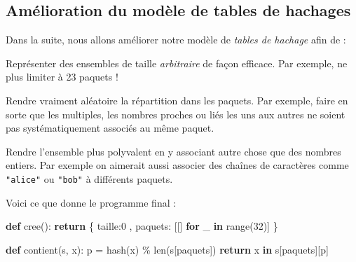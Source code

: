 \documentclass[a4paper,17pt]{extarticle}
\newenvironment{formule}%
{\begin{form}\color{bleuamu}}
{\end{form}}
\newenvironment{Shaded}{}{}
\newcommand{\KeywordTok}[1]{\textcolor[rgb]{0.00,0.44,0.13}{\textbf{{#1}}}}
\newcommand{\DecValTok}[1]{\textcolor[rgb]{0.25,0.63,0.44}{{#1}}}
\newcommand{\StringTok}[1]{\textcolor[rgb]{0.25,0.44,0.63}{{#1}}}
\newcommand{\NormalTok}[1]{{#1}}
\newcommand{\ControlFlowTok}[1]{\textcolor[rgb]{0.00,0.44,0.13}{\textbf{{#1}}}}
\newcommand{\OperatorTok}[1]{\textcolor[rgb]{0.40,0.40,0.40}{{#1}}}
\newcommand{\BuiltInTok}[1]{{#1}}
\begin{document}
    \hypertarget{amuxe9lioration-du-moduxe8le-de-tables-de-hachages}{%
\subsection{\texorpdfstring{Amélioration du modèle de \textbf{tables de
hachages}}{Amélioration du modèle de tables de hachages}}\label{amuxe9lioration-du-moduxe8le-de-tables-de-hachages}}

    Dans la suite, nous allons améliorer notre modèle de \emph{tables de
hachage} afin de :
\begin{formule}
    Représenter des ensembles de taille \emph{arbitraire} de façon efficace.
Par exemple, ne plus limiter à 23 paquets !

        \end{formule}\begin{formule}
    Rendre vraiment aléatoire la répartition dans les paquets. Par exemple,
faire en sorte que les multiples, les nombres proches ou liés les uns
aux autres ne soient pas systématiquement associés au même paquet.

        \end{formule}\begin{formule}
    Rendre l'ensemble plus polyvalent en y associant autre chose que des
nombres entiers. Par exemple on aimerait aussi associer des chaînes de
caractères comme \texttt{"alice"} ou \texttt{"bob"} à différents
paquets.

        \end{formule}\begin{retenir}
    Voici ce que donne le programme final :

\begin{Shaded}
\begin{Highlighting}[]
\KeywordTok{def}\NormalTok{ cree():}
    \ControlFlowTok{return}\NormalTok{ \{ }\StringTok{\textquotesingle{}taille\textquotesingle{}}\NormalTok{:}\DecValTok{0}\NormalTok{ ,}
             \StringTok{\textquotesingle{}paquets\textquotesingle{}}\NormalTok{: [[] }\ControlFlowTok{for}\NormalTok{ \_ }\KeywordTok{in} \BuiltInTok{range}\NormalTok{(}\DecValTok{32}\NormalTok{)] \}}

\KeywordTok{def}\NormalTok{ contient(s, x):}
\NormalTok{    p }\OperatorTok{=} \BuiltInTok{hash}\NormalTok{(x) }\OperatorTok{\%} \BuiltInTok{len}\NormalTok{(s[}\StringTok{\textquotesingle{}paquets\textquotesingle{}}\NormalTok{])}
    \ControlFlowTok{return}\NormalTok{ x }\KeywordTok{in}\NormalTok{ s[}\StringTok{\textquotesingle{}paquets\textquotesingle{}}\NormalTok{][p]}


\end{Highlighting}
\end{Shaded}
\end{retenir}
\end{document}
